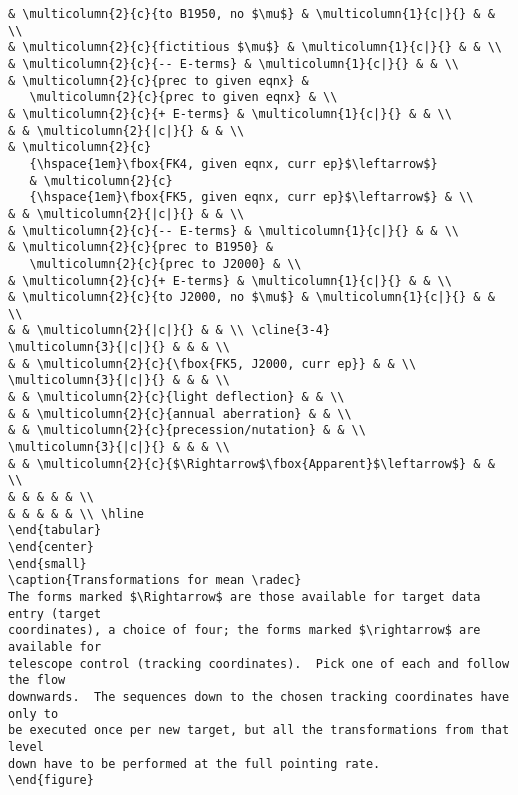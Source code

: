 {\begin{verbatim}
& \multicolumn{2}{c}{to B1950, no $\mu$} & \multicolumn{1}{c|}{} & & \\
& \multicolumn{2}{c}{fictitious $\mu$} & \multicolumn{1}{c|}{} & & \\
& \multicolumn{2}{c}{-- E-terms} & \multicolumn{1}{c|}{} & & \\
& \multicolumn{2}{c}{prec to given eqnx} &
   \multicolumn{2}{c}{prec to given eqnx} & \\
& \multicolumn{2}{c}{+ E-terms} & \multicolumn{1}{c|}{} & & \\
& & \multicolumn{2}{|c|}{} & & \\
& \multicolumn{2}{c}
   {\hspace{1em}\fbox{FK4, given eqnx, curr ep}$\leftarrow$}
   & \multicolumn{2}{c}
   {\hspace{1em}\fbox{FK5, given eqnx, curr ep}$\leftarrow$} & \\
& & \multicolumn{2}{|c|}{} & & \\
& \multicolumn{2}{c}{-- E-terms} & \multicolumn{1}{c|}{} & & \\
& \multicolumn{2}{c}{prec to B1950} &
   \multicolumn{2}{c}{prec to J2000} & \\
& \multicolumn{2}{c}{+ E-terms} & \multicolumn{1}{c|}{} & & \\
& \multicolumn{2}{c}{to J2000, no $\mu$} & \multicolumn{1}{c|}{} & & \\
& & \multicolumn{2}{|c|}{} & & \\ \cline{3-4}
\multicolumn{3}{|c|}{} & & & \\
& & \multicolumn{2}{c}{\fbox{FK5, J2000, curr ep}} & & \\
\multicolumn{3}{|c|}{} & & & \\
& & \multicolumn{2}{c}{light deflection} & & \\
& & \multicolumn{2}{c}{annual aberration} & & \\
& & \multicolumn{2}{c}{precession/nutation} & & \\
\multicolumn{3}{|c|}{} & & & \\
& & \multicolumn{2}{c}{$\Rightarrow$\fbox{Apparent}$\leftarrow$} & & \\
& & & & & \\
& & & & & \\ \hline
\end{tabular}
\end{center}
\end{small}
\caption{Transformations for mean \radec}
The forms marked $\Rightarrow$ are those available for target data entry (target
coordinates), a choice of four; the forms marked $\rightarrow$ are available for
telescope control (tracking coordinates).  Pick one of each and follow the flow
downwards.  The sequences down to the chosen tracking coordinates have only to
be executed once per new target, but all the transformations from that level
down have to be performed at the full pointing rate.
\end{figure}
\end{verbatim}
}

